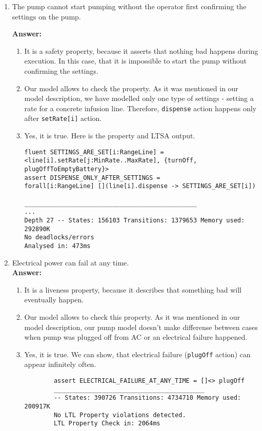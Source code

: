 \documentclass{article}
\begin{document}
\begin{enumerate}
    \item The pump cannot start pumping without the operator first confirming the settings on the pump.
    
    \textbf{Answer:}
    \begin{enumerate}
    \item It is a safety property, because it asserts that nothing bad happens during execution. In this case, that it is impossible to start the pump without confirming the settings.
    \item  Our model allows to check the property. As it was mentioned in our model description, we have modelled only one type of settings - setting a rate for a concrete infusion line. Therefore, \verb|dispense| action happens only after \verb|setRate[i]| action.
    \item Yes, it is true. Here is the property and LTSA output.
	\begin{verbatim}
fluent SETTINGS_ARE_SET[i:RangeLine] =
<line[i].setRate[j:MinRate..MaxRate], {turnOff, plugOffToEmptyBattery}>
assert DISPENSE_ONLY_AFTER_SETTINGS =
forall[i:RangeLine] [](line[i].dispense -> SETTINGS_ARE_SET[i])

_______________________________________________
...
Depth 27 -- States: 156103 Transitions: 1379653 Memory used: 292890K
No deadlocks/errors
Analysed in: 473ms
	\end{verbatim}    
    \end{enumerate}
    
    \item Electrical power can fail at any time.\\
    \textbf{Answer:}
    \begin{enumerate}
    	\item It is a liveness property, because it describes that something bad will eventually happen.
    	\item Our model allows to check this property. As it was mentioned in our model description, our pump model doesn't make differense between cases when pump was plugged off from AC or an electrical failure happened.
    	\item Yes, it is true. We can show, that electrical failure (\verb|plugOff| action) can appear infinitely often.
    	
    	\begin{verbatim}
    	assert ELECTRICAL_FAILURE_AT_ANY_TIME = []<> plugOff
    	_________________________________________
    	-- States: 390726 Transitions: 4734710 Memory used: 200917K
    	No LTL Property violations detected.
    	LTL Property Check in: 2064ms
    	\end{verbatim}
    \end{enumerate}
     

\end{enumerate}
\end{document}
